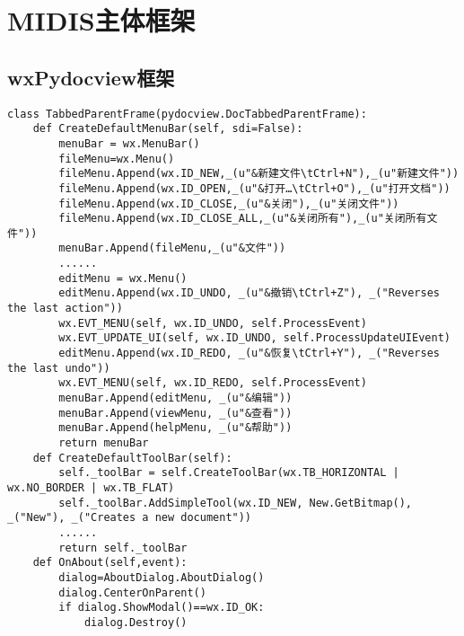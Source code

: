 \section{MIDIS主体框架}


\subsection{wxPydocview框架}



\begin{lstlisting}
class TabbedParentFrame(pydocview.DocTabbedParentFrame):
    def CreateDefaultMenuBar(self, sdi=False):
        menuBar = wx.MenuBar()
        fileMenu=wx.Menu()
        fileMenu.Append(wx.ID_NEW,_(u"&新建文件\tCtrl+N"),_(u"新建文件"))
        fileMenu.Append(wx.ID_OPEN,_(u"&打开…\tCtrl+O"),_(u"打开文档"))
        fileMenu.Append(wx.ID_CLOSE,_(u"&关闭"),_(u"关闭文件"))
        fileMenu.Append(wx.ID_CLOSE_ALL,_(u"&关闭所有"),_(u"关闭所有文件"))
        menuBar.Append(fileMenu,_(u"&文件"))
        ......
        editMenu = wx.Menu()
        editMenu.Append(wx.ID_UNDO, _(u"&撤销\tCtrl+Z"), _("Reverses the last action"))
        wx.EVT_MENU(self, wx.ID_UNDO, self.ProcessEvent)
        wx.EVT_UPDATE_UI(self, wx.ID_UNDO, self.ProcessUpdateUIEvent)
        editMenu.Append(wx.ID_REDO, _(u"&恢复\tCtrl+Y"), _("Reverses the last undo"))
        wx.EVT_MENU(self, wx.ID_REDO, self.ProcessEvent)
        menuBar.Append(editMenu, _(u"&编辑"))
        menuBar.Append(viewMenu, _(u"&查看"))
        menuBar.Append(helpMenu, _(u"&帮助"))
        return menuBar
    def CreateDefaultToolBar(self):
        self._toolBar = self.CreateToolBar(wx.TB_HORIZONTAL | wx.NO_BORDER | wx.TB_FLAT)
        self._toolBar.AddSimpleTool(wx.ID_NEW, New.GetBitmap(), _("New"), _("Creates a new document"))
        ......
        return self._toolBar
    def OnAbout(self,event):
        dialog=AboutDialog.AboutDialog()
        dialog.CenterOnParent()
        if dialog.ShowModal()==wx.ID_OK:
            dialog.Destroy()
\end{lstlisting}

